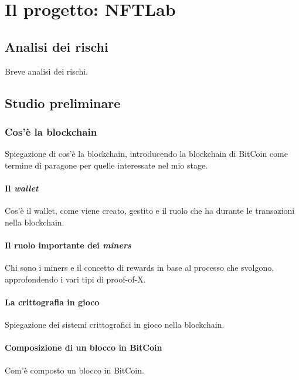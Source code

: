 
\chapter{Il progetto: NFTLab}
\label{cap:nftlab}


\section{Analisi dei rischi}
Breve analisi dei rischi.

\section{Studio preliminare}

\subsection{Cos'è la blockchain}
Spiegazione di cos'è la blockchain, introducendo la blockchain di BitCoin come termine di paragone per quelle interessate nel mio stage.

\subsubsection{Il \emph{wallet}}
Cos'è il wallet, come viene creato, gestito e il ruolo che ha durante le transazioni nella blockchain.

\subsubsection{Il ruolo importante dei \emph{miners}}
Chi sono i miners e il concetto di rewards in base al processo che svolgono, approfondendo i vari tipi di proof-of-X.

\subsubsection{La crittografia in gioco}
Spiegazione dei sistemi crittografici in gioco nella blockchain.

\subsubsection{Composizione di un blocco in BitCoin}
Com'è composto un blocco in BitCoin.

